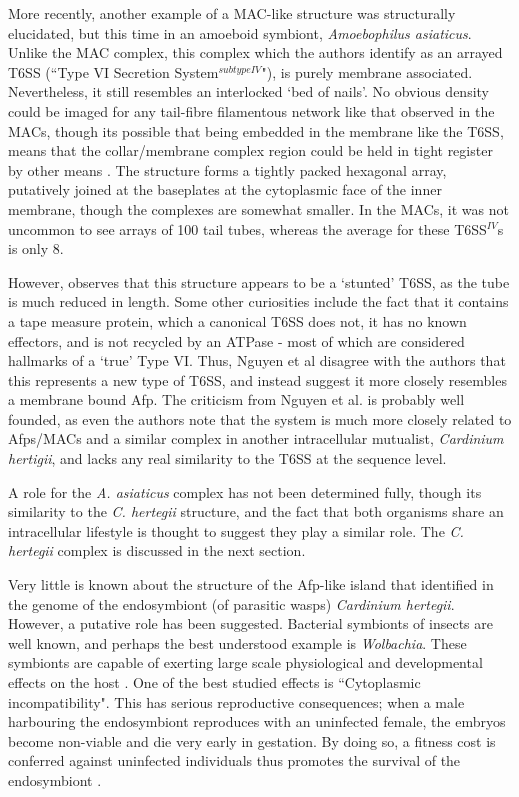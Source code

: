 \label{cis}
\hspace{-.1cm}More recently, another example of a MAC-like structure was structurally elucidated, but this time in an amoeboid symbiont, \emph{Amoebophilus asiaticus}. Unlike the MAC complex, this complex which the authors identify as an arrayed T6SS (``Type VI Secretion System$^{subtype IV}$"), is purely membrane associated. Nevertheless, it still resembles an interlocked `bed of nails'. No obvious density could be imaged for any tail-fibre filamentous network like that observed in the MACs, though its possible that being embedded in the membrane like the T6SS, means that the collar/membrane complex region could be held in tight register by other means \citep{Bock2017}. The structure forms a tightly packed hexagonal array, putatively joined at the baseplates at the cytoplasmic face of the inner membrane, though the complexes are somewhat smaller. In the MACs, it was not uncommon to see arrays of 100 tail tubes, whereas the average for these T6SS$^{IV}$s is only 8.

However, \cite{Nguyen2018} observes that this structure appears to be a `stunted' T6SS, as the tube is much reduced in length. Some other curiosities include the fact that it contains a tape measure protein, which a canonical T6SS does not, it has no known effectors, and is not recycled by an ATPase - most of which are considered hallmarks of a `true' Type VI. Thus, Nguyen et al disagree with the authors that this represents a new type of T6SS, and instead suggest it more closely resembles a membrane bound Afp. The criticism from Nguyen et al. is probably well founded, as even the authors note that the system is much more closely related to Afps/MACs and a similar complex in another intracellular mutualist, \emph{Cardinium hertigii}, and lacks any real similarity to the T6SS at the sequence level.

A role for the \emph{A. asiaticus} complex has not been determined fully, though its similarity to the \emph{C. hertegii} structure, and the fact that both organisms share an intracellular lifestyle is thought to suggest they play a similar role. The \emph{C. hertegii} complex is discussed in the next section.

\hspace{-.1cm}Very little is known about the structure of the Afp-like island that \cite{Penz2012} identified in the genome of the endosymbiont (of parasitic wasps) \emph{Cardinium hertegii}. However, a putative role has been suggested. Bacterial symbionts of insects are well known, and  perhaps the best understood example is \emph{Wolbachia}. These symbionts are capable of exerting large scale physiological and developmental effects on the host \citep{Hedges2008, Oliver2003}. One of the best studied effects is ``Cytoplasmic incompatibility". This has serious reproductive consequences; when a male harbouring the endosymbiont reproduces with an uninfected female, the embryos become non-viable and die very early in gestation. By doing so, a fitness cost is conferred against uninfected individuals thus promotes the survival of the endosymbiont \citep{Werren2008}.

